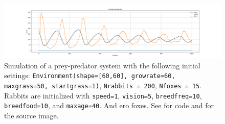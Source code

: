\begin{figure}[!ht]
  \centering
  \includegraphics[width=0.9\linewidth]{images/Ecolab_simulation_no_foxes.png}
  \caption{Simulation of a prey-predator system with the following initial settings: \texttt{Environment(shape=[60,60], growrate=60, maxgrass=50, startgrass=1)}, \texttt{Nrabbits = 200}, \texttt{Nfoxes = 15}. Rabbits are initialized with \texttt{speed=1}, \texttt{vision=5}, \texttt{breedfreq=10}, \texttt{breedfood=10}, and \texttt{maxage=40}. And ero foxes. See \cite{youngaryantwo_initial_conditions_3d_separateICode} for code and \cite{youngaryantwo_initial_conditions_3d_3separateICode} for the source image.}
  \label{fig:Ecolab_pred_prey_no_foxes}
\end{figure}
